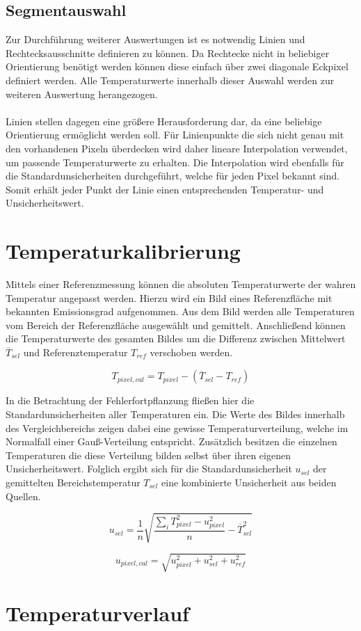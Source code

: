 \documentclass[10pt,a4paper,german]{article}
\begin{document}
\subsection{Segmentauswahl}
Zur Durchführung weiterer Auswertungen ist es notwendig Linien und Rechtecksausschnitte definieren zu können.
Da Rechtecke nicht in beliebiger Orientierung benötigt werden können diese einfach über zwei diagonale Eckpixel definiert werden.
Alle Temperaturwerte innerhalb dieser Auswahl werden zur weiteren Auswertung herangezogen.
\\
\\
Linien stellen dagegen eine größere Herausforderung dar, da eine beliebige Orientierung ermöglicht werden soll.
Für Linienpunkte die sich nicht genau mit den vorhandenen Pixeln überdecken wird daher lineare Interpolation verwendet, um passende Temperaturwerte zu erhalten.
Die Interpolation wird ebenfalls für die Standardunsicherheiten durchgeführt, welche für jeden Pixel bekannt sind.
Somit erhält jeder Punkt der Linie einen entsprechenden Temperatur- und Unsicherheitswert.

\section{Temperaturkalibrierung}
Mittels einer Referenzmessung können die absoluten Temperaturwerte der wahren Temperatur angepasst werden.
Hierzu wird ein Bild eines Referenzfläche mit bekannten Emissionsgrad aufgenommen.
Aus dem Bild werden alle Temperaturen vom Bereich der Referenzfläche ausgewählt und gemittelt.
Anschließend können die Temperaturwerte des gesamten Bildes um die Differenz zwischen Mittelwert $\overline T_{sel}$ und Referenztemperatur $T_\textit{ref}$ verschoben werden.

\begin{equation}
    T_{pixel,cal} = T_{pixel} - \left( \overline T_\textit{sel} - T_\textit{ref} \right)
\end{equation}

In die Betrachtung der Fehlerfortpflanzung fließen hier die Standardunsicherheiten aller Temperaturen ein.
Die Werte des Bildes innerhalb des Vergleichbereichs zeigen dabei eine gewisse Temperaturverteilung, welche im Normalfall einer Gauß-Verteilung entspricht.
Zusätzlich besitzen die einzelnen Temperaturen die diese Verteilung bilden selbst über ihren eigenen Unsicherheitswert.
Folglich ergibt sich für die Standardunsicherheit $u_{sel}$ der gemittelten Bereichstemperatur $T_{sel}$ eine kombinierte Unsicherheit aus beiden Quellen. 

\begin{equation}
    u_{sel} = \frac{1}{n} \sqrt{\frac{\sum_i T_\textit{pixel}^2 - u_\textit{pixel}^2}{n} - \overline T_\textit{sel}^2}
\end{equation}

\begin{equation}
    u_{pixel,cal} = \sqrt{u_{pixel}^2 + u_{sel}^2 + u_\textit{ref}^2}
\end{equation}

\section{Temperaturverlauf}
\end{document}
